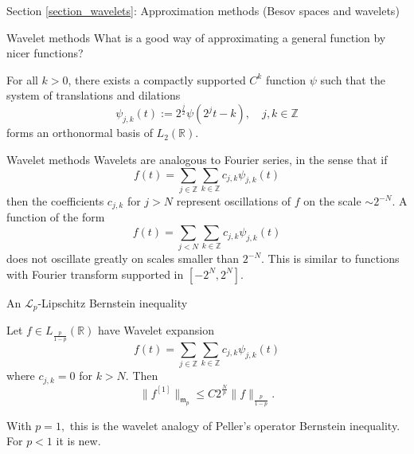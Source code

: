 \documentclass{beamer}
\numberwithin{equation}{section}
\theoremstyle{plain}
\theoremstyle{plain}
\theoremstyle{definition}
\theoremstyle{plain}
\theoremstyle{plain}
\theoremstyle{definition}
\newcommand{\Rl}{\mathbb{R}}
\newcommand{\Itgr}{\mathbb{Z}}
\newcommand{\Lc}{\mathcal{L}}
\newcommand{\mf}{\mathfrak{m}}
\begin{document}
\begin{frame}
    \Huge{Section \ref{section_wavelets}: Approximation methods (Besov spaces and wavelets)}
\end{frame}


\begin{frame}{Wavelet methods}
    What is a good way of approximating a general function by nicer functions?
    \begin{theorem}[Daubechies (1988)]
        For all $k>0$, there exists a compactly supported $C^k$ function $\psi$ such that the system of translations
        and dilations
        \begin{equation*}
            \psi_{j,k}(t) := 2^{\frac{j}{2}}\psi(2^jt-k),\quad j,k\in \Itgr
        \end{equation*}
        forms an orthonormal basis of $L_2(\Rl).$
    \end{theorem}
\end{frame}


\begin{frame}{Wavelet methods}
    Wavelets are analogous to Fourier series, in the sense that if
    \[
        f(t) = \sum_{j\in \Itgr} \sum_{k\in \Itgr} c_{j,k}\psi_{j,k}(t)
    \]
    then the coefficients $c_{j,k}$ for $j>N$ represent oscillations of $f$ on the scale $\sim 2^{-N}.$ A function of the form
    \[
        f(t) = \sum_{j<N} \sum_{k\in \Itgr}c_{j,k}\psi_{j,k}(t)
    \]
    does not oscillate greatly on scales smaller than $2^{-N}.$ This is similar to functions with Fourier transform supported in $[-2^N,2^N].$
\end{frame}

\begin{frame}{An $\Lc_p$-Lipschitz Bernstein inequality}
        \begin{theorem}[M.-Sukochev (2022)]
        Let $f\in L_{\frac{p}{1-p}}(\Rl)$ have Wavelet expansion
        \[
            f(t) = \sum_{j\in \Itgr} \sum_{k\in \Itgr} c_{j,k}\psi_{j,k}(t)
        \]
        where $c_{j,k}=0$ for $k>N.$ Then
        \[
            \|f^{[1]}\|_{\mf_p} \leq C2^{\frac{N}{p}} \|f\|_{\frac{p}{1-p}}.
        \]
    \end{theorem}
    With $p=1,$ this is the wavelet analogy of Peller's operator Bernstein inequality. For $p<1$ it is new.
\end{frame}
\end{document}
